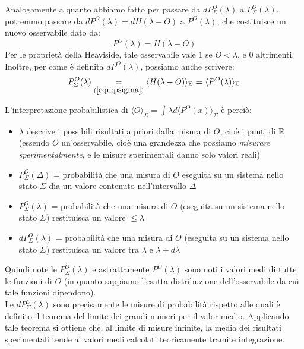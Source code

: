 \documentclass[FisicaTeorica.tex]{subfiles}
\begin{document}
Analogamente a quanto abbiamo fatto per passare da $dP_\Sigma^O(\lambda)$ a $P_\Sigma^O(\lambda)$, potremmo passare da $dP^O(\lambda) = dH(\lambda-O)$ a $P^O(\lambda)$, che costituisce un nuovo osservabile dato da:
\begin{equation}
P^O(\lambda) = H(\lambda-O)
\label{eqn:POdef}
\end{equation}
Per le proprietà della Heaviside, tale osservabile vale $1$ se $O < \lambda$, e $0$ altrimenti.
Inoltre, per come è definita $dP^O(\lambda)$, possiamo anche scrivere:
\[
P_\Sigma^O(\lambda) \underset{(\ref{eqn:psigma})}{=} \langle H(\lambda-O)\rangle_\Sigma \bm{=} \langle P^O(\lambda)\rangle_\Sigma
\]
\begin{comment}
È naturale allora definire l'osservabile 
$P^O\left(\lambda\right)=H(\lambda -O)$, che quindi vale $1$ se $O<\lambda$ e $0$ altrimenti.\\
Allora $\langle f(O)\rangle_\Sigma = \int f(\lambda) d\langle P^O (\lambda)\rangle_\Sigma$ o formalmente:
\[
f\left(O\right)=\int f\left(\lambda\right)dP^O\left(\lambda\right); \quad O=\int \lambda dP^O\left(\lambda\right)
\]
\end{comment}
L'interpretazione probabilistica di $\langle O \rangle_\Sigma = \int \lambda d\langle P^O(x)\rangle_\Sigma$ è perciò:
\begin{itemize}
    \item $\lambda$ descrive i possibili risultati a priori dalla misura di $O$, cioè i punti di $\mathbb{R}$ (essendo $O$ un'osservabile, cioè una grandezza che possiamo \textit{misurare sperimentalmente}, e le misure sperimentali danno solo valori reali)
    \item $P_\Sigma^O\left(\Delta\right)$ = probabilità che una misura di $O$ eseguita su un sistema nello stato $\Sigma$ dia un valore contenuto nell'intervallo $\Delta$
    \item $P_\Sigma^O\left(\lambda\right)$ = probabilità che una misura di $O$ (eseguita su un sistema nello stato $\Sigma$) restituisca un valore $\leq \lambda$
    \item $dP_\Sigma^O\left(\lambda\right)$ = probabilità che una misura di $O$ (eseguita su un sistema nello stato $\Sigma$) restituisca un valore tra $\lambda$ e $\lambda + d\lambda$
\end{itemize}
Quindi note le $P_\Sigma^O\left(\lambda\right)$ e astrattamente $P^O\left(\lambda\right)$ sono noti i valori medi di tutte le funzioni di $O$ (in quanto sappiamo l'esatta distribuzione dell'osservabile da cui tale funzioni dipendono).\\
Le $dP_\Sigma^O\left(\lambda\right)$ sono precisamente le misure di probabilità rispetto alle quali è definito il teorema del limite dei grandi numeri per il valor medio. Applicando tale teorema si ottiene che, al limite di misure infinite, la media dei risultati sperimentali tende ai valori medi calcolati teoricamente tramite integrazione.\\
\end{document}
